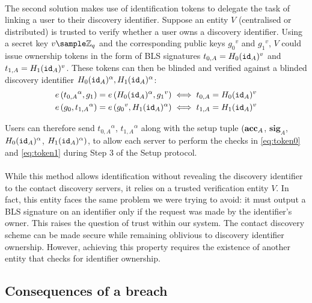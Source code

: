 \paragraph{} The second solution makes use of identification tokens to delegate the task of linking a user to their discovery identifier. Suppose an entity $V$ (centralised or distributed) is trusted to verify whether a user owns a discovery identifier. Using a secret key $v \sample \mathbb{Z}_q$ and the corresponding public keys ${g_0}^v$ and ${g_1}^v $, $V$ could issue ownership tokens in the form of BLS signatures $t_{0,A}= H_0(\mathtt{id}_A)^v$ and $t_{1,A}=H_1(\mathtt{id}_A)^v$. These tokens can then be blinded and verified against a blinded discovery identifier $H_0(\mathtt{id}_A)^\alpha, H_1(\mathtt{id}_A)^\alpha$:
\begin{align}
	\label{eq:token0}
	e\left({t_{0,A}}^\alpha, g_1 \right) = e\left(H_0(\mathtt{id}_A)^\alpha, {g_1}^v \right) &\iff t_{0,A} = H_0(\mathtt{id}_A)^v \\
	\label{eq:token1}
	e\left(g_0, {t_{1,A}}^\alpha \right) = e\left({g_0}^v, H_1(\mathtt{id}_A)^\alpha \right) &\iff t_{1,A} = H_1(\mathtt{id}_A)^v
\end{align}

\noindent Users can therefore send ${t_{0,A}}^\alpha$, ${t_{1,A}}^\alpha$ along with the setup tuple $(\mathbf{acc}_A$, $\mathbf{sig}_A$, $H_0(\mathtt{id}_A)^\alpha$, $H_1(\mathtt{id}_A)^\alpha)$, to allow each server to perform the checks in \autoref{eq:token0} and \autoref{eq:token1} during Step 3 of the Setup protocol.

\paragraph{} While this method allows identification without revealing the discovery identifier to the contact discovery servers, it relies on a trusted verification entity $V$. In fact, this entity faces the same problem we were trying to avoid: it must output a BLS signature on an identifier only if the request was made by the identifier's owner. This raises the question of trust within our system. The contact discovery scheme can be made secure while remaining oblivious to discovery identifier ownership. However, achieving this property requires the existence of another entity that checks for identifier ownership.

	\subsection{Consequences of a breach}
	

